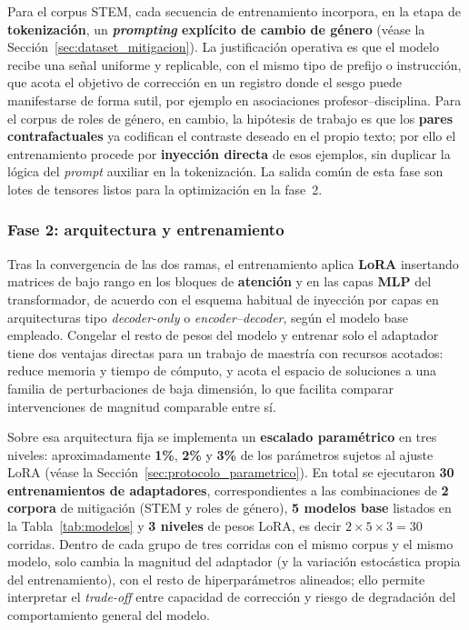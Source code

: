 \documentclass[12pt,a4paper]{report}
\begin{document}
Para el corpus STEM, cada secuencia de entrenamiento incorpora, en la etapa de \textbf{tokenización}, un \textbf{\emph{prompting} explícito de cambio de género} (véase la Sección~\ref{sec:dataset_mitigacion}). La justificación operativa es que el modelo recibe una señal uniforme y replicable, con el mismo tipo de prefijo o instrucción, que acota el objetivo de corrección en un registro donde el sesgo puede manifestarse de forma sutil, por ejemplo en asociaciones profesor--disciplina. Para el corpus de roles de género, en cambio, la hipótesis de trabajo es que los \textbf{pares contrafactuales} ya codifican el contraste deseado en el propio texto; por ello el entrenamiento procede por \textbf{inyección directa} de esos ejemplos, sin duplicar la lógica del \emph{prompt} auxiliar en la tokenización. La salida común de esta fase son lotes de tensores listos para la optimización en la fase~2.

\subsubsection*{Fase 2: arquitectura y entrenamiento}

Tras la convergencia de las dos ramas, el entrenamiento aplica \textbf{LoRA} \cite{hu_lora_2021} insertando matrices de bajo rango en los bloques de \textbf{atención} y en las capas \textbf{MLP} del transformador, de acuerdo con el esquema habitual de inyección por capas en arquitecturas tipo \textit{decoder-only} o \textit{encoder--decoder}, según el modelo base empleado. Congelar el resto de pesos del modelo y entrenar solo el adaptador tiene dos ventajas directas para un trabajo de maestría con recursos acotados: reduce memoria y tiempo de cómputo, y acota el espacio de soluciones a una familia de perturbaciones de baja dimensión, lo que facilita comparar intervenciones de magnitud comparable entre sí.

Sobre esa arquitectura fija se implementa un \textbf{escalado paramétrico} en tres niveles: aproximadamente \textbf{1\%}, \textbf{2\%} y \textbf{3\%} de los parámetros sujetos al ajuste LoRA (véase la Sección~\ref{sec:protocolo_parametrico}). En total se ejecutaron \textbf{30 entrenamientos de adaptadores}, correspondientes a las combinaciones de \textbf{2 corpora} de mitigación (STEM y roles de género), \textbf{5 modelos base} listados en la Tabla~\ref{tab:modelos} y \textbf{3 niveles} de pesos LoRA, es decir $2 \times 5 \times 3 = 30$ corridas. Dentro de cada grupo de tres corridas con el mismo corpus y el mismo modelo, solo cambia la magnitud del adaptador (y la variación estocástica propia del entrenamiento), con el resto de hiperparámetros alineados; ello permite interpretar el \textit{trade-off} entre capacidad de corrección y riesgo de degradación del comportamiento general del modelo.
\end{document}
